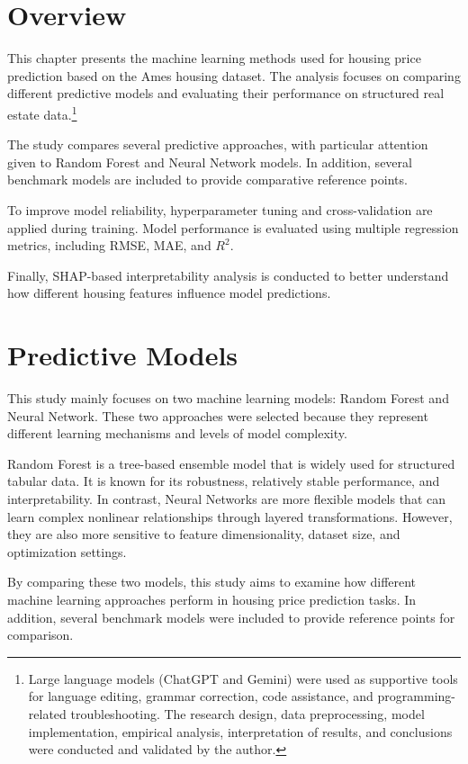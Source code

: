 \documentclass[12pt,a4paper,oneside,openany]{book}
\begin{document}
\section{Overview}

This chapter presents the machine learning methods used for housing price prediction based on the Ames housing dataset. The analysis focuses on comparing different predictive models and evaluating their performance on structured real estate data.\footnote{
Large language models (ChatGPT and Gemini) were used as supportive tools for language editing, grammar correction, code assistance, and programming-related troubleshooting. The research design, data preprocessing, model implementation, empirical analysis, interpretation of results, and conclusions were conducted and validated by the author.
}

The study compares several predictive approaches, with particular attention given to Random Forest and Neural Network models. In addition, several benchmark models are included to provide comparative reference points.

To improve model reliability, hyperparameter tuning and cross-validation are applied during training. Model performance is evaluated using multiple regression metrics, including RMSE, MAE, and $R^2$.

Finally, SHAP-based interpretability analysis is conducted to better understand how different housing features influence model predictions.



\section{Predictive Models}

This study mainly focuses on two machine learning models: Random Forest and Neural Network. These two approaches were selected because they represent different learning mechanisms and levels of model complexity.

Random Forest is a tree-based ensemble model that is widely used for structured tabular data. It is known for its robustness, relatively stable performance, and interpretability. In contrast, Neural Networks are more flexible models that can learn complex nonlinear relationships through layered transformations. However, they are also more sensitive to feature dimensionality, dataset size, and optimization settings.

By comparing these two models, this study aims to examine how different machine learning approaches perform in housing price prediction tasks. In addition, several benchmark models were included to provide reference points for comparison.
\end{document}
